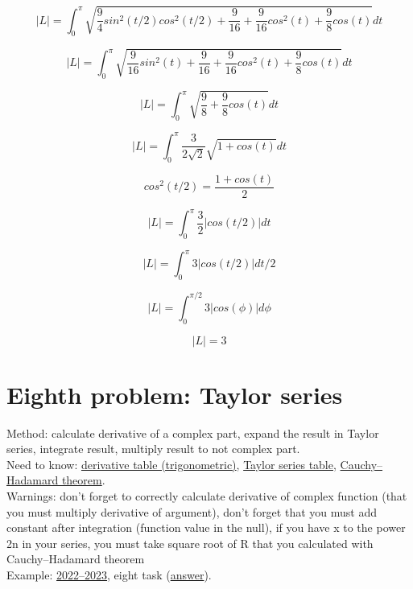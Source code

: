 \documentclass{article}
\begin{document}
\begin{equation*}
    |L| = \int_{0}^{\pi} \sqrt{\frac{9}{4} sin^2(t/2) cos^2(t/2)+\frac{9}{16}+\frac{9}{16}cos^2(t)+\frac{9}{8}cos(t)}dt
\end{equation*}

\begin{equation*}
    |L| = \int_{0}^{\pi} \sqrt{\frac{9}{16} sin^2(t)+\frac{9}{16}+\frac{9}{16}cos^2(t)+\frac{9}{8}cos(t)}dt
\end{equation*}

\begin{equation*}
    |L| = \int_{0}^{\pi} \sqrt{\frac{9}{8}+\frac{9}{8}cos(t)}dt
\end{equation*}

\begin{equation*}
    |L| = \int_{0}^{\pi} \frac{3}{2\sqrt{2}} \sqrt{1+cos(t)}dt
\end{equation*}

\begin{equation*}
    cos^2(t/2) = \frac{1+cos(t)}{2}
\end{equation*}

\begin{equation*}
    |L| = \int_{0}^{\pi} \frac{3}{2} | cos(t/2) | dt
\end{equation*}

\begin{equation*}
    |L| = \int_{0}^{\pi} 3 | cos(t/2) | dt/2
\end{equation*}

\begin{equation*}
    |L| = \int_{0}^{\pi/2} 3 | cos(\phi) | d\phi
\end{equation*}

\begin{equation}
    |L| = 3
\end{equation}

\newpage
\section{Eighth problem: Taylor series}
Method: calculate derivative of a complex part, expand the result in Taylor series, integrate result, multiply result to not complex part. \\
Need to know: \hyperlink{8.1}{derivative table (trigonometric)}, \hyperlink{8.2}{Taylor series table}, \hyperlink{8.3}{Cauchy–Hadamard theorem}. \\
Warnings: don't forget to correctly calculate derivative of complex function (that you must multiply derivative of argument), don't forget that you must add constant after integration (function value in the null), if you have x to the power 2n in your series, you must take square root of R that you calculated with Cauchy–Hadamard theorem \\
Example: \href{https://old.mipt.ru/education/chair/mathematics/exams/exams/2022-23/%D0%9C%D0%90%D0%98%D0%B8%D0%A0_%D0%92_23.pdf}{2022–2023}, eight task (\href{https://old.mipt.ru/education/chair/mathematics/exams/exams/2022-23/%D0%9C%D0%90%D0%98%D0%B8%D0%A0_%D0%92_23%D0%BE%D1%82%D0%B2%D0%B5%D1%82%D1%8B.pdf}{answer}).
\end{document}
